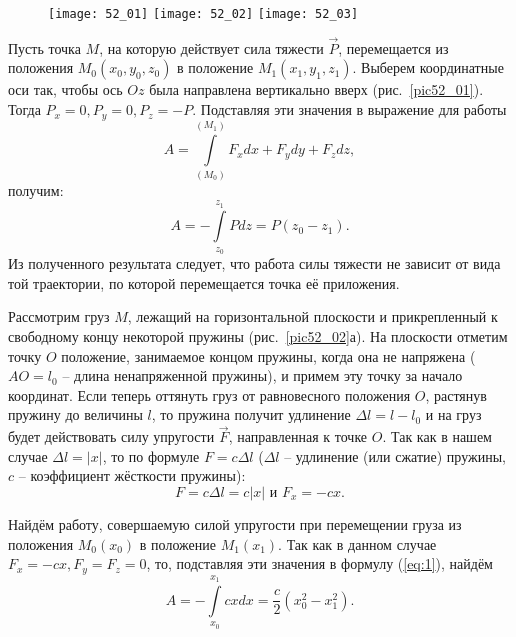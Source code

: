 
\begin{figure}[b]
    \texttt{[image: 52\_01]}\hfill
    \texttt{[image: 52\_02]}\hfill
    \texttt{[image: 52\_03]}
    \parbox{.32\textwidth}{\caption{} \label{pic52_01}}\hfill
    \parbox{.32\textwidth}{\caption{} \label{pic52_02}}\hfill
    \parbox{.32\textwidth}{\caption{} \label{pic52_03}}
\end{figure}
Пусть точка \( M \), на которую действует сила тяжести \( \vec{P} \), 
перемещается из положения \( M_0(x_0, y_0, z_0) \) в положение 
\( M_1(x_1, y_1, z_1) \). Выберем координатные оси так, чтобы ось \( Oz \) 
была направлена вертикально вверх (рис.~\ref{pic52_01}). Тогда 
\( P_x = 0, P_y = 0, P_z = -P \). Подставляя эти значения в выражение для работы
\begin{equation}
    A = \int\limits_{(M_0)}^{(M_1)} F_x dx + F_y dy + F_z dz,
    \label{eq:1}    
\end{equation}
получим:
\[ 
    A = - \int\limits_{z_0}^{z_1} Pdz = 
    P\left(z_0 - z_1 \right).
\]
Из полученного результата следует, что работа силы тяжести не зависит от 
вида той траектории, по которой перемещается точка её приложения.

Рассмотрим груз \( M \), лежащий на горизонтальной плоскости и 
прикрепленный к свободному концу некоторой пружины (рис.~\ref{pic52_02}а). На 
плоскости отметим точку \( O \) положение, занимаемое концом пружины, 
когда она не напряжена (\( AO = l_0 \) -- длина ненапряженной пружины), и 
примем эту точку за начало координат. Если теперь оттянуть груз от 
равновесного положения \( O \), растянув пружину до величины \( l \), то
пружина получит удлинение \( \Delta l = l - l_0 \) и на груз будет действовать 
силу упругости \( \vec{F} \), направленная к точке \( O \). Так как в 
нашем случае \( \Delta l = |x| \), то по формуле \( F = c\Delta l \) 
(\( \Delta l \) -- удлинение (или сжатие) пружины, \( c \) -- коэффициент 
жёсткости пружины):
\[
    F = c\Delta l = c|x| \text{ и } F_x = -cx.
\]

Найдём работу, совершаемую силой упругости при перемещении груза из 
положения \( M_0(x_0) \) в положение \( M_1(x_1) \). Так как в данном 
случае \( F_x = -cx, F_y = F_z = 0 \), то, подставляя эти значения в 
формулу (\ref{eq:1}), найдём
\[ 
    A = - \int\limits_{x_0}^{x_1} cxdx = 
    \frac{c}{2} \left( x^{2}_0 - x^{2}_1 \right).
\]


